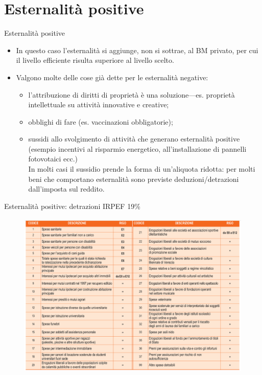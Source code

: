 \documentclass[aspectratio=64,12pt]{beamer}
\begin{document}
\section{Esternalità positive}

\begin{frame}{Esternalità positive}
\begin{itemize}
\item In questo caso l'esternalità si aggiunge, non si sottrae, al BM privato,
per cui il livello efficiente risulta \alert{superiore} al livello scelto.
\item Valgono molte delle cose già dette per le esternalità negative:
\begin{itemize}
\item l'attribuzione di diritti di proprietà è una soluzione---es. proprietà
intellettuale su attività innovative e creative;
\item obblighi di fare (es. vaccinazioni obbligatorie);
\item sussidi allo svolgimento di attività che generano esternalità positive
(esempio incentivi al risparmio energetico, all'installazione di pannelli
fotovotaici ecc.)\\[2mm] In molti casi il sussidio prende la forma di
un'\alert{aliquota ridotta}: per molti beni che comportano esternalità sono
previste deduzioni/detrazioni dall'imposta sul reddito.
\end{itemize}
\end{itemize}
\end{frame}

\begin{frame}{Esternalità positive: detrazioni IRPEF 19\%}
\begin{figure}[htbp] \centering
\includegraphics[height=8cm]{./figure/detrazioni-spese-730.png}
\end{figure}
\end{frame}
\end{document}
